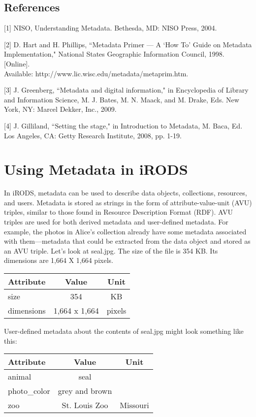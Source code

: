 \documentclass[10pt,oneside]{memoir}
\begin{document}
\subsection{References}

[1] NISO, Understanding Metadata. Bethesda, MD: NISO Press, 2004.

[2] D. Hart and H. Phillips, ``Metadata Primer --- A `How To' Guide on Metadata Implementation," National States Geographic Information Council, 1998. [Online]. \\
Available: http://www.lic.wisc.edu/metadata/metaprim.htm.

[3] J. Greenberg, ``Metadata and digital information," in Encyclopedia of Library and Information Science, M. J. Bates, M. N. Maack, and M. Drake, Eds. New York, NY: Marcel Dekker, Inc., 2009.

[4] J. Gilliland, ``Setting the stage," in Introduction to Metadata, M. Baca, Ed. Los Angeles, CA: Getty Research Institute, 2008, pp. 1-19.

\section{Using Metadata in iRODS}

In iRODS, metadata can be used to describe data objects, collections, resources, and users. Metadata is stored as strings in the form of attribute-value-unit (AVU) triples, similar to those found in Resource Description Format (RDF). AVU triples are used for both derived metadata and user-defined metadata. For example, the photos in Alice's collection already have some metadata associated with them---metadata that could be extracted from the data object and stored as an AVU triple. Let's look at seal.jpg. The size of the file is 354 KB. Its dimensions are 1,664 X 1,664 pixels.

\begin{center}
\begin{tabular}{ |l|c|c| }
 \hline
Attribute & Value & Unit \\
\hline
size & 354 & KB \\
dimensions & 1,664 x 1,664 & pixels \\
 \hline
\end{tabular}
\end{center}

User-defined metadata about the contents of seal.jpg might look something like this:

\begin{center}
\begin{tabular}{ |l|c|c| }
 \hline
Attribute & Value & Unit \\
\hline
animal & seal & \\
photo\_color & grey and brown & \\
zoo & St. Louis Zoo & Missouri \\
 \hline
\end{tabular}
\end{center}
\end{document}
